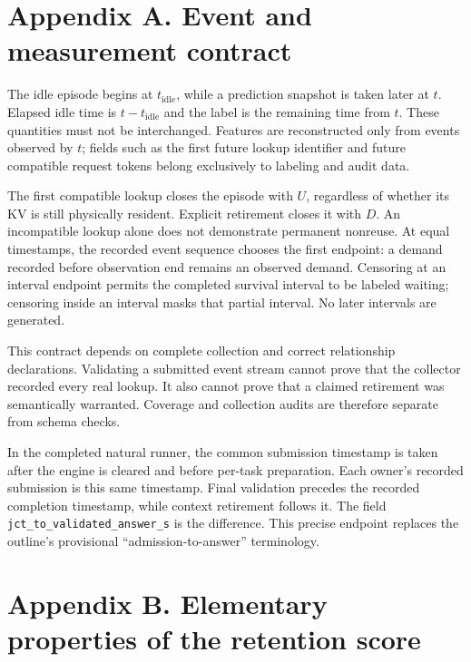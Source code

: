 \documentclass[
  english,
  10pt,
]{article}
\begin{document}
\clearpage

\section{Appendix A. Event and measurement
contract}\label{appendix-a.-event-and-measurement-contract}

The idle episode begins at \(t_{\mathrm{idle}}\), while a prediction
snapshot is taken later at \(t\). Elapsed idle time is
\(t-t_{\mathrm{idle}}\) and the label is the remaining time from \(t\).
These quantities must not be interchanged. Features are reconstructed
only from events observed by \(t\); fields such as the first future
lookup identifier and future compatible request tokens belong
exclusively to labeling and audit data.

The first compatible lookup closes the episode with \(U\), regardless of
whether its KV is still physically resident. Explicit retirement closes
it with \(D\). An incompatible lookup alone does not demonstrate
permanent nonreuse. At equal timestamps, the recorded event sequence
chooses the first endpoint: a demand recorded before observation end
remains an observed demand. Censoring at an interval endpoint permits
the completed survival interval to be labeled waiting; censoring inside
an interval masks that partial interval. No later intervals are
generated.

This contract depends on complete collection and correct relationship
declarations. Validating a submitted event stream cannot prove that the
collector recorded every real lookup. It also cannot prove that a
claimed retirement was semantically warranted. Coverage and collection
audits are therefore separate from schema checks.

In the completed natural runner, the common submission timestamp is
taken after the engine is cleared and before per-task preparation. Each
owner's recorded submission is this same timestamp. Final validation
precedes the recorded completion timestamp, while context retirement
follows it. The field \nolinkurl{jct_to_validated_answer_s} is the
difference. This precise endpoint replaces the outline's provisional
``admission-to-answer'' terminology.

\section{Appendix B. Elementary properties of the retention
score}\label{appendix-b.-elementary-properties-of-the-retention-score}
\end{document}

